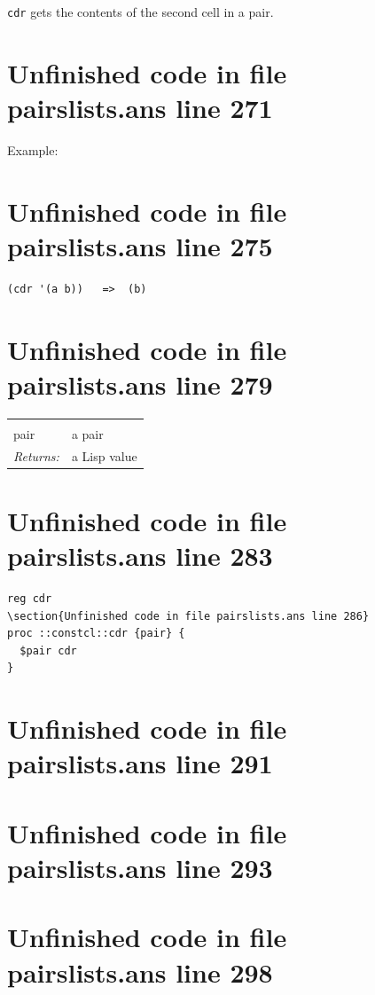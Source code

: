 \documentclass[twoside,9pt]{report}
\begin{document}
\texttt{cdr} gets the contents of the second cell in a pair.

\section{Unfinished code in file pairslists.ans line 271}


Example:

\section{Unfinished code in file pairslists.ans line 275}
\begin{verbatim}
(cdr '(a b))   =>  (b)
\end{verbatim}
\section{Unfinished code in file pairslists.ans line 279}
\noindent\begin{tabular}{ |p{1.9cm} p{8cm}| }
\hline
\rowcolor[HTML]{CCCCCC} \multicolumn{2}{|l|}{\bf cdr (public)} \\
pair & a pair \\
\textit{Returns:} & a Lisp value \\
\hline
\end{tabular}
\section{Unfinished code in file pairslists.ans line 283}
\begin{lstlisting}
reg cdr
\section{Unfinished code in file pairslists.ans line 286}
proc ::constcl::cdr {pair} {
  $pair cdr
}
\end{lstlisting}
\section{Unfinished code in file pairslists.ans line 291}
\section{Unfinished code in file pairslists.ans line 293}
\section{Unfinished code in file pairslists.ans line 298}
\end{document}
